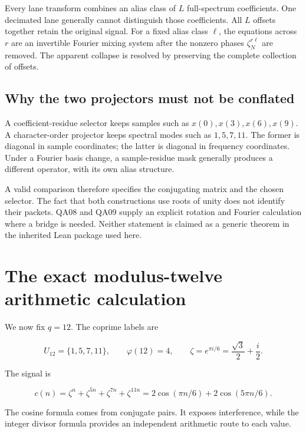 Every lane transform combines an alias class of \(L\) full-spectrum
coefficients. One decimated lane generally cannot distinguish those
coefficients. All \(L\) offsets together retain the original signal. For
a fixed alias class \(\ell\), the equations across \(r\) are an
invertible Fourier mixing system after the nonzero phases
\(\zeta_N^{r\ell}\) are removed. The apparent collapse is resolved by
preserving the complete collection of offsets.

\hypertarget{q:why-the-two-projectors-must-not-be-conflated}{%
\subsection{Why the two projectors must not be
conflated}\label{q:why-the-two-projectors-must-not-be-conflated}}

A coefficient-residue selector keeps samples such as
\(x(0),x(3),x(6),x(9)\). A character-order projector keeps spectral
modes such as \(1,5,7,11\). The former is diagonal in sample
coordinates; the latter is diagonal in frequency coordinates. Under a
Fourier basis change, a sample-residue mask generally produces a
different operator, with its own alias structure.

A valid comparison therefore specifies the conjugating matrix and the
chosen selector. The fact that both constructions use roots of unity
does not identify their packets. QA08 and QA09 supply an explicit
rotation and Fourier calculation where a bridge is needed. Neither
statement is claimed as a generic theorem in the inherited Lean package
used here.

\hypertarget{q:the-exact-modulus-twelve-arithmetic-calculation}{%
\section{The exact modulus-twelve arithmetic
calculation}\label{q:the-exact-modulus-twelve-arithmetic-calculation}}

We now fix \(q=12\). The coprime labels are

\[
U_{12}=\{1,5,7,11\},
\qquad \varphi(12)=4,
\qquad \zeta=e^{\pi i/6}=\frac{\sqrt3}{2}+\frac i2.
\]

The signal is

\[
c(n)=\zeta^n+\zeta^{5n}+\zeta^{7n}+\zeta^{11n}
=2\cos(\pi n/6)+2\cos(5\pi n/6).
\]

The cosine formula comes from conjugate pairs. It exposes interference,
while the integer divisor formula provides an independent arithmetic
route to each value.

